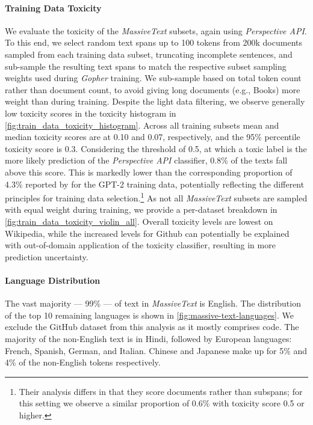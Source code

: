 \documentclass[11pt, a4paper, logo, internal, copyright, nonumbering]{deepmind}
\newcommand{\massivetext}{\textit{MassiveText}\xspace}
\newcommand{\gopher}{\textit{Gopher}\xspace}
\newcommand{\perspectiveapi}{\textit{Perspective API}\xspace}
\begin{document}
\paragraph{Training Data Toxicity}
\label{sec:training_data_toxicity}
We evaluate the toxicity of the \massivetext subsets, again using \perspectiveapi.
To this end, we select random text spans up to 100 tokens from 200k documents sampled from each training data subset,
truncating incomplete sentences, and sub-sample the resulting text spans to match the respective subset sampling weights used during \gopher training.
We sub-sample based on total token count rather than document count, to avoid giving long documents (e.g., Books) more weight than during training.
Despite the light data filtering, we observe generally low toxicity scores in the toxicity histogram in \autoref{fig:train_data_toxicity_histogram}. 
Across all training subsets mean and median toxicity scores are at 0.10 and 0.07, respectively, and the 95\% percentile toxicity score is 0.3.
Considering the threshold of 0.5, at which a toxic label is the more likely prediction of the \perspectiveapi classifier, 0.8\% of the texts fall above this score.
This is markedly lower than the corresponding proportion of 4.3\% reported by \cite{gehman2020realtoxicityprompts} for the GPT-2 training data, potentially reflecting the different principles for training data selection.\footnote{Their analysis differs in that they score documents rather than subspans; for this setting we observe a similar proportion of 0.6\% with toxicity score 0.5 or higher.}
As not all \massivetext subsets are sampled with equal weight during training, we provide a per-dataset breakdown in \autoref{fig:train_data_toxicity_violin_all}.
Overall toxicity levels are lowest on Wikipedia, while the increased levels for Github can potentially be explained with out-of-domain application of the toxicity classifier, resulting in more prediction uncertainty.

\paragraph{Language Distribution}
The vast majority — 99\% — of text in \massivetext is English. The distribution of the top 10 remaining languages is shown in \autoref{fig:massive-text-languages}. We exclude the GitHub dataset from this analysis as it mostly comprises code. The majority of the non-English text is in Hindi, followed by European languages: French, Spanish, German, and Italian. Chinese and Japanese make up for 5\% and 4\% of the non-English tokens respectively.
\end{document}
